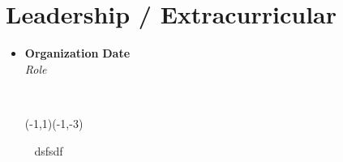 \documentclass[letterpaper,5pt]{article}
\newcommand{\smalltextbullet}{\,\begin{picture}(-1,1)(-1,-3)\circle*{3}\end{picture}\ }
\begin{document}
    
    
    \section{\textbf{Leadership / Extracurricular}}
    \begin{itemize}
    \item[]
    
    \textbf{Organization} \hfill \textbf{Date} \\
    \textit{Role}
    \begin{itemize}
        \vspace*{-2mm}
        \smalltextbullet{} dsfsdf
    \end{itemize}
    
    \end{itemize}
    
    
    
\end{document}

